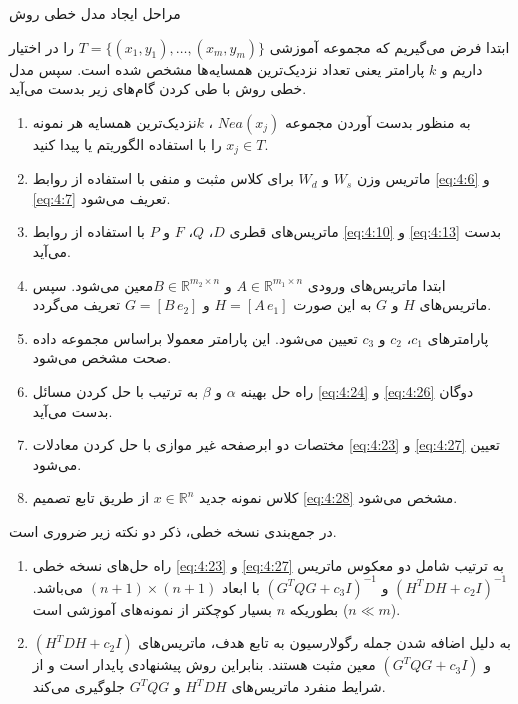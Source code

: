 \newpage
\begin{algo}
	مراحل ایجاد مدل خطی روش 
	
	ابتدا فرض می‌گیریم که مجموعه آموزشی $T=\{(x_1, y_1),\dots,(x_m, y_m)\}$  را در اختیار داریم و $k$ پارامتر یعنی تعداد نزدیک‌ترین همسایه‌ها مشخص شده است. سپس مدل خطی روش  با طی کردن گام‌های زیر بدست می‌آید.
	
	\begin{enumerate}
		\item به منظور بدست آوردن مجموعه $Nea(x_{j})$ ،  $k$نزدیک‌ترین همسایه هر نمونه  $x_{j} \in T$ را با استفاده الگوریتم  یا  پیدا کنید.
		\item ماتریس وزن $W_s$  و $W_d$  برای کلاس مثبت و منفی با استفاده از روابط \ref{eq:4:6} و \ref{eq:4:7}  تعریف می‌شود.
		\item ماتریس‌های قطری  $D$،  $Q$، $F$  و $P$  با استفاده از روابط \ref{eq:4:10} و \ref{eq:4:13} بدست می‌آید.
		\item ابتدا ماتریس‌های ورودی  $A \in \mathbb{R}^{m_1 \times n}$ و   $B \in \mathbb{R}^{m_2 \times n}$معین می‌شود. سپس ماتریس‌های  $H$  و $G$  به این صورت  $H=[A\,e_{1}]$ و $G=[B\,e_{2}]$ تعریف می‌گردد.
		\item پارامترهای  $c_{1}$، $c_{2}$  و $c_{3}$ تعیین می‌شود. این پارامتر معمولا براساس مجموعه داده صحت مشخص می‌شود.
		\item راه حل بهینه $\alpha$  و $\beta$  به ترتیب با حل کردن مسائل \ref{eq:4:24} و \ref{eq:4:26} دوگان بدست می‌آید.
		\item مختصات دو ابرصفحه غیر موازی با حل کردن معادلات \ref{eq:4:23} و \ref{eq:4:27} تعیین می‌شود.
		\item کلاس نمونه جدید  $x \in \mathbb{R}^{n}$ از طریق تابع تصمیم \ref{eq:4:28} مشخص می‌شود.
	\end{enumerate}
\end{algo}

در جمع‌بندی نسخه خطی، ذکر دو نکته زیر ضروری است.
\begin{enumerate}
	\item راه حل‌های نسخه خطی \ref{eq:4:23} و \ref{eq:4:27} به ترتیب شامل دو معکوس ماتریس   $(H^{T}DH+c_{2}I)^{-1}$ و  $(G^{T}QG+c_{3}I)^{-1}$ با ابعاد $(n+1)\times(n+1)$  می‌باشد. بطوریکه $n$ بسیار کوچکتر از نمونه‌های آموزشی است ($n \ll m$).
	\item به دلیل اضافه شدن جمله رگولارسیون به تابع هدف، ماتریس‌های   $(H^{T}DH+c_{2}I)$ و   $(G^{T}QG+c_{3}I)$ معین مثبت هستند. بنابراین روش پیشنهادی پایدار است و از شرایط منفرد ماتریس‌های $H^{T}DH$ و $G^{T}QG$  جلوگیری می‌کند.
\end{enumerate}

